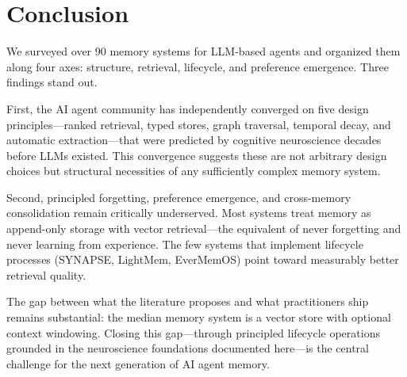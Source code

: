 \section{Conclusion}
\label{sec:conclusion}

We surveyed over 90 memory systems for LLM-based agents and organized
them along four axes: structure, retrieval, lifecycle, and preference
emergence. Three findings stand out.

First, the AI agent community has independently converged on five
design principles---ranked retrieval, typed stores, graph traversal,
temporal decay, and automatic extraction---that were predicted by
cognitive neuroscience decades before LLMs existed. This convergence
suggests these are not arbitrary design choices but structural
necessities of any sufficiently complex memory system.

Second, principled forgetting, preference emergence, and cross-memory
consolidation remain critically underserved. Most systems treat memory
as append-only storage with vector retrieval---the equivalent of
never forgetting and never learning from experience. The few systems
that implement lifecycle processes (SYNAPSE, LightMem, EverMemOS) point
toward measurably better retrieval quality.

The gap between what the literature proposes and what practitioners
ship remains substantial: the median memory system is a vector store
with optional context windowing. Closing this gap---through principled
lifecycle operations grounded in the neuroscience foundations
documented here---is the central challenge for the next generation of
AI agent memory.
